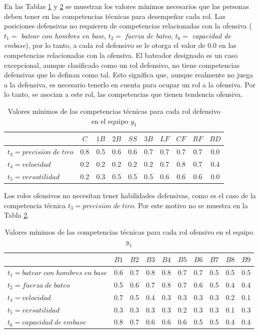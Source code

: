 En las Tablas \ref{mctd1-pel} y \ref{mcto1-pel} se muestran los valores mínimos necesarios que las personas deben tener en las competencias técnicas para desempeñar cada rol. Las posiciones defensivas no requieren de competencias relacionadas con la ofensiva ($t_1=$ \textit{batear con hombres en base}, $t_2=$ \textit{fuerza de bateo}, $t_6=$ \textit{capacidad de embase}), por lo tanto, a cada rol defensivo se le otorga el valor de 0.0 en las competencias relacionadas con la ofensiva. El bateador designado es un caso excepcional, aunque clasificado como un rol defensivo, no tiene competencias defensivas que lo definan como tal. Esto significa que, aunque realmente no juega a la defensiva, es necesario tenerlo en cuenta para ocupar un rol a la ofensiva. Por lo tanto, se asocian a este rol, las competencias que tienen tendencia ofensiva.
\begin{table}[H]
	\centering
	\caption{Valores mínimos de las competencias técnicas para cada rol defensivo en el equipo $y_1$}\label{mctd1-pel}
	\begin{tabular}{|l|c|c|c|c|c|c|c|c|c|}
		\hline
		\thead{$Q(t,r,y)$} & $C$ & $1B$  & $2B$ & $SS$ & $3B$ & $LF$ & $CF$ & $RF$ & $BD$  \\ \hline
		$t_3=precisi\acute{o}n\;de\;tiro$ 		 & 0.8 &  0.5  &  0.6 & 0.6  & 0.7  & 0.7  & 0.7  &  0.7 & 0.0 \\ \hline
		$t_4=velocidad$ 		 & 0.2 &  0.2  &  0.2 & 0.2  & 0.2  & 0.7  & 0.8  &  0.7 &  0.4 \\ \hline
		$t_5=versatilidad$   	 & 0.2 &  0.3  &  0.5 & 0.5  & 0.5  & 0.6  & 0.6  &  0.6 & 0.0 \\ \hline
	\end{tabular}
\end{table}

Los roles ofensivos no necesitan tener habilidades defensivas, como es el caso de la competencia técnica $t_3=precisi\acute{o}n\;de\;tiro$. Por este motivo no se muestra en la Tabla \ref{mcto1-pel}.

\begin{table}[H]
	\centering
	\caption{Valores mínimos de las competencias técnicas para cada rol ofensivo en el equipo $y_1$}\label{mcto1-pel}
	\begin{tabular}{|l|c|c|c|c|c|c|c|c|c|}
		\hline
		\thead{$Q(t,r,y)$} & $B1$ & $B2$ & $B3$ & $B4$ & $B5$ & $B6$ & $B7$ & $B8$ & $B9$  \\ \hline
		$t_1=batear\;con\;hombres\;en\;base$ 	     & 0.6  & 0.7  & 0.8  & 0.8  & 0.7  & 0.7  & 0.5  & 0.5  & 0.5 \\ \hline
		$t_2=fuerza\;de\;bateo$ 		 & 0.5  & 0.6  & 0.7  & 0.8  & 0.7  & 0.6  & 0.5  & 0.4  & 0.4 \\ \hline
		$t_4=velocidad$ 		 & 0.7  & 0.5  & 0.4  & 0.3  & 0.3  & 0.3  & 0.3  & 0.2  & 0.1 \\ \hline
		$t_5=versatilidad$   	 & 0.3  & 0.3  & 0.3  & 0.3  & 0.2  & 0.3  & 0.3  & 0.1  & 0.3 \\ \hline
		$t_6=capacidad\;de\;embase$ & 0.8 &  0.7  &  0.6 & 0.6  & 0.6  & 0.5  & 0.5  &  0.4 & 0.4 \\ \hline
	\end{tabular} 
\end{table}


